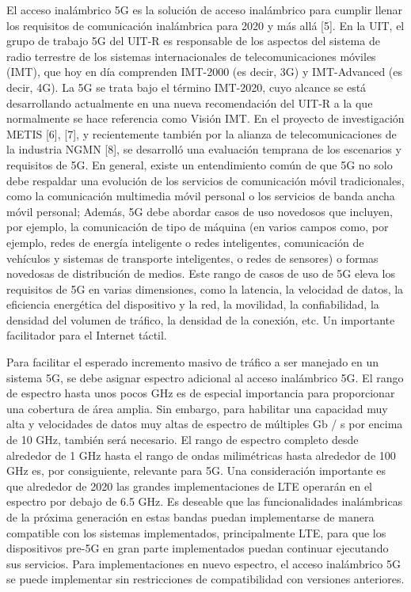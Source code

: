 \documentclass[12pt,journal,compsoc]{IEEEtran}
\begin{document}
El acceso inalámbrico 5G es la solución de acceso inalámbrico para cumplir llenar los requisitos de comunicación inalámbrica para 2020 y más allá [5]. En la UIT, el grupo de trabajo 5G del UIT-R es responsable de los aspectos del sistema de radio terrestre de los sistemas internacionales de telecomunicaciones móviles (IMT), que hoy en día comprenden IMT-2000 (es decir, 3G) y IMT-Advanced (es decir, 4G). La 5G se trata bajo el término IMT-2020, cuyo alcance se está desarrollando actualmente en una nueva recomendación del UIT-R a la que normalmente se hace referencia como Visión IMT. En el proyecto de investigación METIS [6], [7], y recientemente también por la alianza de telecomunicaciones de la industria NGMN [8], se desarrolló una evaluación temprana de los escenarios y requisitos de 5G. En general, existe un entendimiento común de que 5G no solo debe respaldar una evolución de los servicios de comunicación móvil tradicionales, como la comunicación multimedia móvil personal o los servicios de banda ancha móvil personal; Además, 5G debe abordar casos de uso novedosos que incluyen, por ejemplo, la comunicación de tipo de máquina (en varios campos como, por ejemplo, redes de energía inteligente o redes inteligentes, comunicación de vehículos y sistemas de transporte inteligentes, o redes de sensores) o formas novedosas de distribución de medios. Este rango de casos de uso de 5G eleva los requisitos de 5G en varias dimensiones, como la latencia, la velocidad de datos, la eficiencia energética del dispositivo y la red, la movilidad, la confiabilidad, la densidad del volumen de tráfico, la densidad de la conexión, etc. Un importante facilitador para el Internet táctil.

Para facilitar el esperado incremento masivo de tráfico a ser manejado en un sistema 5G, se debe asignar espectro adicional al acceso inalámbrico 5G. El rango de espectro hasta unos pocos GHz es de especial importancia para proporcionar una cobertura de área amplia. Sin embargo, para habilitar una capacidad muy alta y velocidades de datos muy altas de espectro de múltiples Gb / s por encima de 10 GHz, también será necesario. El rango de espectro completo desde alrededor de 1 GHz hasta el rango de ondas milimétricas hasta alrededor de 100 GHz es, por consiguiente, relevante para 5G. Una consideración importante es que alrededor de 2020 las grandes implementaciones de LTE operarán en el espectro por debajo de 6.5 GHz. Es deseable que las funcionalidades inalámbricas de la próxima generación en estas bandas puedan implementarse de manera compatible con los sistemas implementados, principalmente LTE, para que los dispositivos pre-5G en gran parte implementados puedan continuar ejecutando sus servicios. Para implementaciones en nuevo espectro, el acceso inalámbrico 5G se puede implementar sin restricciones de compatibilidad con versiones anteriores.
\end{document}
